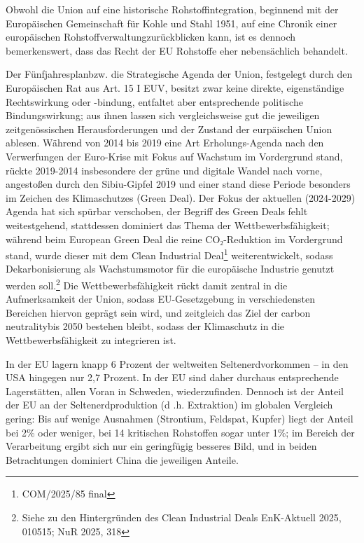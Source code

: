 \documentclass[12pt,a4paper,oneside]{book} %
\begin{document}
Obwohl die Union auf eine historische Rohstoffintegration, beginnend mit der Europäischen Gemeinschaft für Kohle und Stahl 1951, auf eine \glqq Chronik einer europäischen Rohstoffverwaltung\glqq zurückblicken kann, ist es dennoch bemerkenswert, dass das Recht der EU Rohstoffe eher nebensächlich behandelt.\autocite{Schorkopf, Europäische Rohstoffverwaltung, Rn. 1}

Der \glqq Fünfjahresplan\grqq bzw. die Strategische Agenda der Union, festgelegt durch den Europäischen Rat aus Art. 15 I EUV, besitzt zwar keine direkte, eigenständige Rechtswirkung oder -bindung, entfaltet aber entsprechende politische Bindungswirkung; aus ihnen lassen sich vergleichsweise gut die jeweiligen zeitgenössischen Herausforderungen und der Zustand der eurpäischen Union ablesen. Während von 2014 bis 2019 eine Art Erholungs-Agenda nach den Verwerfungen der Euro-Krise mit Fokus auf Wachstum im Vordergrund stand,\autocite{https://www.consilium.europa.eu/media/30186/qcao14001den.pdf} rückte 2019-2014 insbesondere der grüne und digitale Wandel nach vorne, angestoßen durch den Sibiu-Gipfel 2019\autocite{(Bergmann, Handlexikon EU, Zeittafel der europäischen Einigung} und einer  stand diese Periode besonders im Zeichen des Klimaschutzes (Green Deal).\autocite{https://www.consilium.europa.eu/en/eu-strategic-agenda-2019-2024/} Der Fokus der aktuellen (2024-2029) Agenda\autocite{https://www.consilium.europa.eu/media/w5gdkvhv/sn02167de24_web.pdf} hat sich spürbar verschoben, der Begriff des Green Deals fehlt weitestgehend, stattdessen dominiert das Thema der Wettbewerbsfähigkeit; während beim European Green Deal die reine CO₂-Reduktion im Vordergrund stand, wurde dieser mit dem Clean Industrial Deal\footnote{COM/2025/85 final} weiterentwickelt, sodass Dekarbonisierung als Wachstumsmotor für die europäische Industrie genutzt werden soll.\footnote{Siehe zu den Hintergründen des Clean Industrial Deals EnK-Aktuell 2025, 010515; NuR 2025, 318} Die Wettbewerbsfähigkeit rückt damit zentral in die Aufmerksamkeit der Union, sodass EU-Gesetzgebung in verschiedensten Bereichen hiervon geprägt sein wird, und zeitgleich das Ziel der \glqq carbon neutrality\grqq bis 2050 bestehen bleibt, sodass der Klimaschutz in die Wettbewerbsfähigkeit zu integrieren ist.\autocite{Frenz 2025, S. 1060}

In der EU lagern knapp 6 Prozent der weltweiten Seltenerdvorkommen -- in den USA hingegen nur 2,7 Prozent. In der EU sind daher durchaus entsprechende Lagerstätten, allen Voran in Schweden, wiederzufinden. Dennoch ist der Anteil der EU an der Seltenerdproduktion (d .h. Extraktion) im globalen Vergleich gering: Bis auf wenige Ausnahmen (Strontium, Feldspat, Kupfer) liegt der Anteil bei 2\% oder weniger, bei 14 kritischen Rohstoffen sogar unter 1\%; im Bereich der Verarbeitung ergibt sich nur ein geringfügig besseres Bild, und in beiden Betrachtungen dominiert China die jeweiligen Anteile.\autocite{European parliament: Monitoring the Supply of ciritical raw materials in the EU, PE 785.676, S. 4-5}
\end{document}
